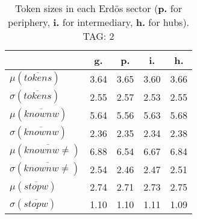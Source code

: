 \begin{table}[h!]
\begin{center}
\begin{tabular}{| l | c | c | c | c |}\hline
 & g. & p. & i. & h. \\\hline
$\mu(\overline{tokens})$ & 3.64  & 3.65  & 3.60  & 3.66 \\\hline
$\sigma(\overline{tokens})$ & 2.55  & 2.57  & 2.53  & 2.55 \\\hline
$\mu(\overline{knownw})$ & 5.64  & 5.56  & 5.63  & 5.68 \\\hline
$\sigma(\overline{knownw})$ & 2.36  & 2.35  & 2.34  & 2.38 \\\hline
$\mu(\overline{knownw \neq})$ & 6.88  & 6.54  & 6.67  & 6.84 \\\hline
$\sigma(\overline{knownw \neq})$ & 2.54  & 2.46  & 2.47  & 2.51 \\\hline
$\mu(\overline{stopw})$ & 2.74  & 2.71  & 2.73  & 2.75 \\\hline
$\sigma(\overline{stopw})$ & 1.10  & 1.10  & 1.11  & 1.09 \\\hline
\end{tabular}
\caption{Token sizes in each Erd\"os sector ({{\bf p.}} for periphery, {{\bf i.}} for intermediary, {{\bf h.}} for hubs). TAG: 2}
\end{center}
\end{table}